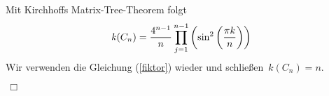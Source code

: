 Mit Kirchhoffs Matrix-Tree-Theorem folgt
\begin{equation*}
 \mathit{k}(C_n)=\frac{4^{n-1}}{n}\prod_{j=1}^{n-1} \left(\sin^2\left(\frac{\pi k}{n}\right) \right)\\
\end{equation*}
Wir verwenden die Gleichung (\ref{fiktor}) wieder und schließen $\,\mathit{k}(C_n)=n$.\; 
\begin{flushright} $\,\Box\,$ \end{flushright} 
